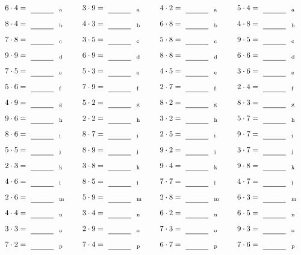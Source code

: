 \documentclass
[
  draft    = true,
  fontsize = 11pt,
  parskip  = half-
]
{scrartcl}
\begin{document}
\par\vfill\par
\begin{align*}
    \pline{6\cdot4}&=\rline{a}
  & \pline{3\cdot9}&=\rline{a}
  & \pline{4\cdot2}&=\rline{a}
  & \pline{5\cdot4}&=\rline{a} \\[1ex]
    \pline{8\cdot4}&=\rline{b}
  & \pline{4\cdot3}&=\rline{b}
  & \pline{6\cdot8}&=\rline{b}
  & \pline{4\cdot8}&=\rline{b} \\[1ex]
    \pline{7\cdot8}&=\rline{c}
  & \pline{3\cdot5}&=\rline{c}
  & \pline{5\cdot8}&=\rline{c}
  & \pline{9\cdot5}&=\rline{c} \\[1ex]
    \pline{9\cdot9}&=\rline{d}
  & \pline{6\cdot9}&=\rline{d}
  & \pline{8\cdot8}&=\rline{d}
  & \pline{6\cdot6}&=\rline{d} \\[1ex]
    \pline{7\cdot5}&=\rline{e}
  & \pline{5\cdot3}&=\rline{e}
  & \pline{4\cdot5}&=\rline{e}
  & \pline{3\cdot6}&=\rline{e} \\[1ex]
    \pline{5\cdot6}&=\rline{f}
  & \pline{7\cdot9}&=\rline{f}
  & \pline{2\cdot7}&=\rline{f}
  & \pline{2\cdot4}&=\rline{f} \\[1ex]
    \pline{4\cdot9}&=\rline{g}
  & \pline{5\cdot2}&=\rline{g}
  & \pline{8\cdot2}&=\rline{g}
  & \pline{8\cdot3}&=\rline{g} \\[1ex]
    \pline{9\cdot6}&=\rline{h}
  & \pline{2\cdot2}&=\rline{h}
  & \pline{3\cdot2}&=\rline{h}
  & \pline{5\cdot7}&=\rline{h} \\[1ex]
    \pline{8\cdot6}&=\rline{i}
  & \pline{8\cdot7}&=\rline{i}
  & \pline{2\cdot5}&=\rline{i}
  & \pline{9\cdot7}&=\rline{i} \\[1ex]
    \pline{5\cdot5}&=\rline{j}
  & \pline{8\cdot9}&=\rline{j}
  & \pline{9\cdot2}&=\rline{j}
  & \pline{3\cdot7}&=\rline{j} \\[1ex]
    \pline{2\cdot3}&=\rline{k}
  & \pline{3\cdot8}&=\rline{k}
  & \pline{9\cdot4}&=\rline{k}
  & \pline{9\cdot8}&=\rline{k} \\[1ex]
    \pline{4\cdot6}&=\rline{l}
  & \pline{8\cdot5}&=\rline{l}
  & \pline{7\cdot7}&=\rline{l}
  & \pline{4\cdot7}&=\rline{l} \\[1ex]
    \pline{2\cdot6}&=\rline{m}
  & \pline{5\cdot9}&=\rline{m}
  & \pline{2\cdot8}&=\rline{m}
  & \pline{6\cdot3}&=\rline{m} \\[1ex]
    \pline{4\cdot4}&=\rline{n}
  & \pline{3\cdot4}&=\rline{n}
  & \pline{6\cdot2}&=\rline{n}
  & \pline{6\cdot5}&=\rline{n} \\[1ex]
    \pline{3\cdot3}&=\rline{o}
  & \pline{2\cdot9}&=\rline{o}
  & \pline{7\cdot3}&=\rline{o}
  & \pline{9\cdot3}&=\rline{o} \\[1ex]
    \pline{7\cdot2}&=\rline{p}
  & \pline{7\cdot4}&=\rline{p}
  & \pline{6\cdot7}&=\rline{p}
  & \pline{7\cdot6}&=\rline{p}
\end{align*}
\end{document}
